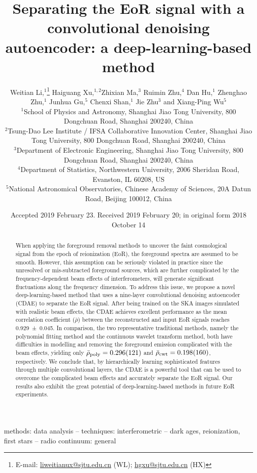 \documentclass[fleqn,usenatbib]{mnras}
\title[EoR signal separation with a CDAE]{%
  Separating the EoR signal with a convolutional denoising autoencoder:
  a deep-learning-based method
}
\author[Li~et~al.]{%
Weitian Li,$^{1}$\thanks{E-mail:
  \href{mailto:liweitianux@sjtu.edu.cn}{liweitianux@sjtu.edu.cn} (WL);
  \href{mailto:hgxu@sjtu.edu.cn}{hgxu@sjtu.edu.cn} (HX)}
Haiguang Xu,$^{1,2}$\footnotemark[1]
Zhixian Ma,$^{3}$
Ruimin Zhu,$^{4}$
Dan Hu,$^{1}$
Zhenghao Zhu,$^{1}$
\newauthor  %
Junhua Gu,$^{5}$
Chenxi Shan,$^{1}$
Jie Zhu$^{3}$
and
Xiang-Ping Wu$^{5}$
\\
$^{1}${School of Physics and Astronomy,
  Shanghai Jiao Tong University,
  800 Dongchuan Road, Shanghai 200240, China} \\
$^{2}${Tsung-Dao Lee Institute / IFSA Collaborative Innovation Center,
  Shanghai Jiao Tong University,
  800 Dongchuan Road, Shanghai 200240, China} \\
$^{3}${Department of Electronic Engineering,
  Shanghai Jiao Tong University,
  800 Dongchuan Road, Shanghai 200240, China} \\
$^{4}${Department of Statistics,
  Northwestern University,
  2006 Sheridan Road, Evanston, IL 60208, US} \\
$^{5}${National Astronomical Observatories,
  Chinese Academy of Sciences,
  20A Datun Road, Beijing 100012, China}
}
\date{%
  Accepted 2019 February 23.
  Received 2019 February 20;
  in original form 2018 October 14
}
\newcommand{\R}[1]{\mathrm{#1}}
\begin{document}
\label{firstpage}
\pagerange{\pageref{firstpage}--\pageref{lastpage}}
\maketitle

%
%
\begin{abstract}
When applying the foreground removal methods to uncover the
faint cosmological signal from the epoch of reionization (EoR),
the foreground spectra are assumed to be smooth.
However, this assumption can be seriously violated in practice since
the unresolved or mis-subtracted foreground sources, which are further
complicated by the frequency-dependent beam effects of interferometers,
will generate significant fluctuations along the frequency dimension.
To address this issue, we propose a novel deep-learning-based method
that uses a nine-layer convolutional denoising autoencoder (CDAE) to
separate the EoR signal.
After being trained on the SKA images simulated with realistic beam
effects, the CDAE achieves excellent performance as the mean correlation
coefficient ($\bar{\rho}$) between the reconstructed and input EoR
signals reaches \num{0.929 +- 0.045}.
In comparison,
the two representative traditional methods, namely the polynomial
fitting method and the continuous wavelet transform method, both have
difficulties in modelling and removing the foreground emission
complicated with the beam effects,
yielding only
$\bar{\rho}_{\R{poly}} = \num{0.296 +- 0.121}$ and
$\bar{\rho}_{\R{cwt}} = \num{0.198 +- 0.160}$, respectively.
We conclude that, by hierarchically learning sophisticated features
through multiple convolutional layers, the CDAE is a powerful tool that
can be used to overcome the complicated beam effects and accurately
separate the EoR signal.
Our results also exhibit the great
potential of deep-learning-based methods in future EoR experiments.
\end{abstract}

\begin{keywords}
methods: data analysis --
techniques: interferometric --
dark ages, reionization, first stars --
radio continuum: general
\end{keywords}


\end{document}
